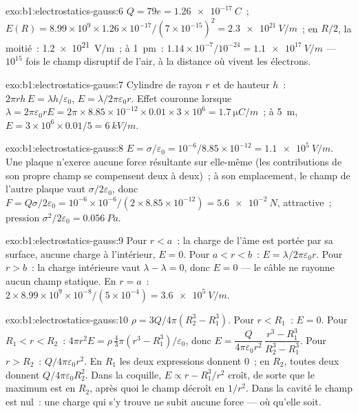 \begin{solution}{exo:b1:electrostatics-gauss:6}
$Q = 79e = \qty{1.26e-17}{C}$~; $E(R) = 8.99 \times 10^9 \times 1.26 \times 10^{-17}/
(7 \times 10^{-15})^2 = \qty{2.3e21}{V/m}$~; en $R/2$, la moitié~: \qty{1.2e21}{V/m}~; à
\qty{1}{pm}~: $1.14 \times 10^{-7}/10^{-24} = \qty{1.1e17}{V/m}$ --- $10^{15}$ fois
le champ disruptif de l'air, à la distance où vivent les électrons.
\end{solution}

\begin{solution}{exo:b1:electrostatics-gauss:7}
Cylindre de rayon $r$ et de hauteur $h$~: $2\pi rh\,E = \lambda h/\varepsilon_0$, $E =
\lambda/2\pi\varepsilon_0r$. Effet couronne lorsque $\lambda = 2\pi\varepsilon_0 rE = 2\pi \times 8.85 \times
10^{-12} \times 0.01 \times 3 \times 10^6 = \qty{1.7}{\micro C/m}$~; à \qty{5}{m},
$E = 3 \times 10^6 \times 0.01/5 = \qty{6}{kV/m}$.
\end{solution}

\begin{solution}{exo:b1:electrostatics-gauss:8}
$E = \sigma/\varepsilon_0 = 10^{-6}/8.85 \times 10^{-12} = \qty{1.1e5}{V/m}$. Une plaque
n'exerce aucune force résultante sur elle-même (les contributions de son propre
champ se compensent deux à deux)~; à son emplacement, le champ de l'autre
plaque vaut $\sigma/2\varepsilon_0$, donc
$F = Q\sigma/2\varepsilon_0 = 10^{-6} \times 10^{-6}/(2 \times 8.85 \times 10^{-12}) =
\qty{5.6e-2}{N}$, attractive~; pression $\sigma^2/2\varepsilon_0 = \qty{0.056}{Pa}$.
\end{solution}

\begin{solution}{exo:b1:electrostatics-gauss:9}
Pour $r < a$~: la charge de l'âme est portée par sa surface, aucune charge à
l'intérieur, $E = 0$. Pour $a < r < b$~: $E = \lambda/2\pi\varepsilon_0r$. Pour $r > b$~:
la charge intérieure vaut $\lambda - \lambda = 0$, donc $E = 0$ --- le câble ne
rayonne aucun champ statique. En $r = a$~: $2 \times 8.99 \times 10^9 \times 10^{-8}/(5 \times 10^{-4}) =
\qty{3.6e5}{V/m}$.
\end{solution}

\begin{solution}{exo:b1:electrostatics-gauss:10}
$\rho = 3Q/4\pi(R_2^3 - R_1^3)$. Pour $r < R_1$~: $E = 0$. Pour $R_1 < r < R_2$~: $4\pi r^2E =
\rho\,\tfrac43\pi(r^3 - R_1^3)/\varepsilon_0$, donc $E = \dfrac{Q}{4\pi\varepsilon_0r^2}\,
\dfrac{r^3 - R_1^3}{R_2^3 - R_1^3}$. Pour $r > R_2$~: $Q/4\pi\varepsilon_0r^2$. En $R_1$ les deux
expressions donnent $0$~; en $R_2$, toutes deux donnent $Q/4\pi\varepsilon_0R_2^2$. Dans la coquille, $E
\propto r - R_1^3/r^2$ croît, de sorte que le maximum est en $R_2$, après quoi
le champ décroît en $1/r^2$. Dans la cavité le champ est nul~: une charge qui
s'y trouve ne subit aucune force --- où qu'elle soit.
\end{solution}

